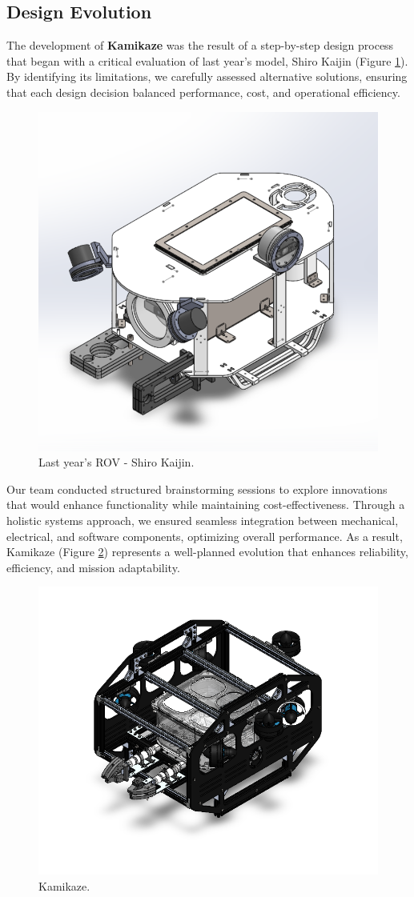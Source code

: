 \subsection{Design Evolution}
The development of \textbf{Kamikaze} was the result of a step-by-step design process that began with a critical evaluation of last year’s model, Shiro Kaijin (Figure \ref{fig:shiro_kaijin}). By identifying its limitations, we carefully assessed alternative solutions, ensuring that each design decision balanced performance, cost, and operational efficiency. 

\begin{figure}[h]
    \centering
    \includegraphics[width=0.7\columnwidth]{Sections/2Design Rationale/images/Shiro Kaijin.png}
    \caption{Last year's ROV - Shiro Kaijin.}
    \label{fig:shiro_kaijin}
\end{figure}

Our team conducted structured brainstorming sessions to explore innovations that would enhance functionality while maintaining cost-effectiveness. Through a holistic systems approach, we ensured seamless integration between mechanical, electrical, and software components, optimizing overall performance. As a result, Kamikaze (Figure \ref{fig:Kamikaze}) represents a well-planned evolution that enhances reliability, efficiency, and mission adaptability.

\begin{figure}[hb!]
    \centering
    \includegraphics[width=0.7\columnwidth]{Sections/2Design Rationale/images/Kamikaze.png}
    \caption{Kamikaze.}
    \label{fig:Kamikaze}
\end{figure}


